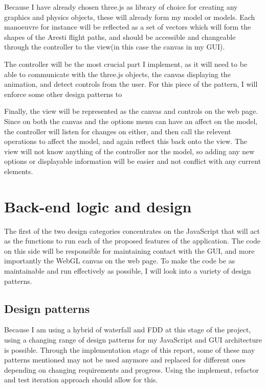 Because I have already chosen three.js as library of choice for creating any graphics and physics objects, these will already form my model or models. Each manoeuvre for instance will be reflected as a set of vectors which will form the shapes of the Aresti flight paths, and should be accessible and changeable through the controller to the view(in this case the canvas in my GUI).

The controller will be the most crucial part I implement, as it will need to be able to communicate with the three.js objects, the canvas displaying the animation, and detect controls from the user. For this piece of the pattern, I will enforce some other design patterns to 

Finally, the view will be represented as the canvas and controls on the web page. Since on both the canvas and the options menu can have an affect on the model, the controller will listen for changes on either, and then call the relevent operations to affect the model, and again reflect this back onto the view. The view will not know anything of the controller nor the model, so adding any new options or displayable information will be easier and not conflict with any current elements.

\section{Back-end logic and design}
The first of the two design categories concentrates on the JavaScript that will act as the functions to run each of the proposed features of the application. The code on this side will be responsible for maintaining contact with the GUI, and more importantly the WebGL canvas on the web page. To make the code be as maintainable and run effectively as possible, I will look into a variety of design patterns.

\subsection{Design patterns}
Because I am using a hybrid of waterfall and FDD at this stage of the project, using a changing range of design patterns for my JavaScript and GUI architecture is possible. Through the implementation stage of this report, some of these may patterns mentioned may not be used anymore and replaced for different ones depending on changing requirements and progress. Using the implement, refactor and test iteration approach should allow for this.

